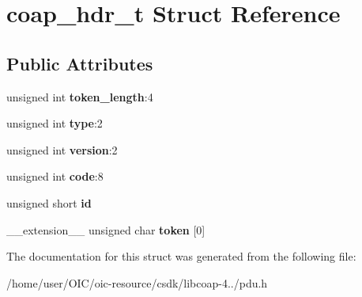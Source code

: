 \hypertarget{structcoap__hdr__t}{}\section{coap\+\_\+hdr\+\_\+t Struct Reference}
\label{structcoap__hdr__t}
\subsection*{Public Attributes}
\begin{DoxyCompactItemize}
\item 
\hypertarget{structcoap__hdr__t_a95de357c10ed88e3e36ecece61e34fed}{}unsigned int {\bfseries token\+\_\+length}\+:4\label{structcoap__hdr__t_a95de357c10ed88e3e36ecece61e34fed}

\item 
\hypertarget{structcoap__hdr__t_ab99ea23386efdf958944fa31fb87f01b}{}unsigned int {\bfseries type}\+:2\label{structcoap__hdr__t_ab99ea23386efdf958944fa31fb87f01b}

\item 
\hypertarget{structcoap__hdr__t_a625254d3cd6447e646851dded82b2333}{}unsigned int {\bfseries version}\+:2\label{structcoap__hdr__t_a625254d3cd6447e646851dded82b2333}

\item 
\hypertarget{structcoap__hdr__t_a083d84268cded2de6f0a64858260fc3b}{}unsigned int {\bfseries code}\+:8\label{structcoap__hdr__t_a083d84268cded2de6f0a64858260fc3b}

\item 
\hypertarget{structcoap__hdr__t_ab30d2e30d15c5e70784e6e694fa4065a}{}unsigned short {\bfseries id}\label{structcoap__hdr__t_ab30d2e30d15c5e70784e6e694fa4065a}

\item 
\hypertarget{structcoap__hdr__t_afd334210006d7cf25d7921ca872aa97d}{}\+\_\+\+\_\+extension\+\_\+\+\_\+ unsigned char {\bfseries token} \mbox{[}0\mbox{]}\label{structcoap__hdr__t_afd334210006d7cf25d7921ca872aa97d}

\end{DoxyCompactItemize}


The documentation for this struct was generated from the following file\+:\begin{DoxyCompactItemize}
\item 
/home/user/\+O\+I\+C/oic-\/resource/csdk/libcoap-\/4../pdu.\+h\end{DoxyCompactItemize}
